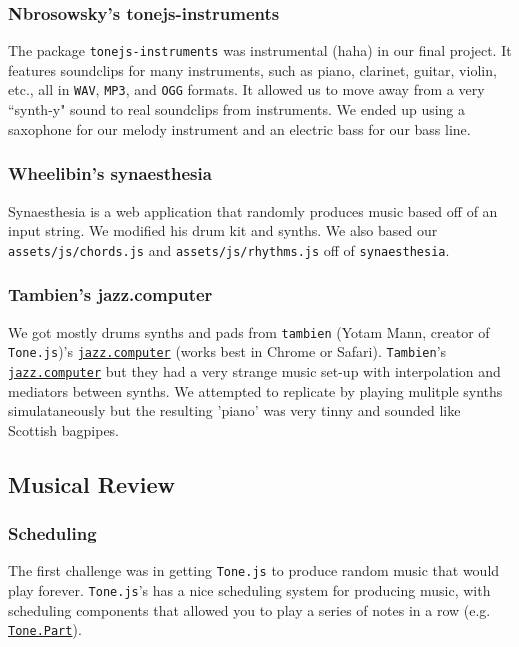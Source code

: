 \documentclass[12pt,a4paper]{article}
\newcommand{\code}{\texttt}
\newcommand{\lightcode}[1]{\colorbox{light-gray}{\texttt{#1}}}
\begin{document}
\subsubsection{Nbrosowsky's tonejs-instruments}
The package \lightcode{tonejs-instruments} was instrumental (haha) in our final project. It features soundclips for many instruments, such as piano, clarinet, guitar, violin, etc., all in \code{WAV}, \code{MP3}, and \code{OGG} formats. It allowed us to move away from a very ``synth-y" sound to real soundclips from instruments. We ended up using a saxophone for our melody instrument and an electric bass for our bass line.

\subsubsection{Wheelibin's synaesthesia}
Synaesthesia is a web application that randomly produces music based off of an input string. We modified his drum kit and synths. We also based our \code{assets/js/chords.js} and \code{assets/js/rhythms.js} off of \lightcode{synaesthesia}.

\subsubsection{Tambien's jazz.computer}
We got mostly drums synths and pads from \code{tambien} (Yotam Mann, creator of \lightcode{Tone.js})'s \href{http://jazz.computer/}{\lightcode{jazz.computer}} (works best in Chrome or Safari). \code{Tambien}'s \href{http://jazz.computer/}{\lightcode{jazz.computer}} but they had a very strange music set-up with interpolation and mediators between synths. We attempted to replicate by playing mulitple synths simulataneously but the resulting 'piano' was very tinny and sounded like Scottish bagpipes.


\subsection{Musical Review}

\subsubsection{Scheduling}
The first challenge was in getting \lightcode{Tone.js} to produce random music that would play forever. \lightcode{Tone.js}'s has a nice scheduling system for producing music, with scheduling components that allowed you to play a series of notes in a row (e.g. \href{https://tonejs.github.io/docs/r12/Part}{\lightcode{Tone.Part}}).
\end{document}

